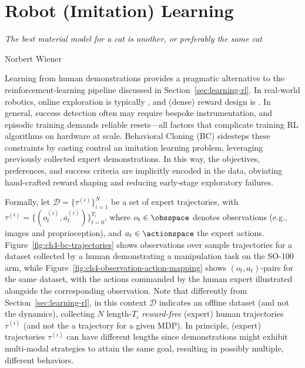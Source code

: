 \section{Robot (Imitation) Learning}
\label{sec:learning-bc-single}

\epigraph{\emph{The best material model for a cat is another, or preferably the same cat}}{Norbert Wiener}




Learning from human demonstrations provides a pragmatic alternative to the reinforcement-learning pipeline discussed in Section~\ref{sec:learning-rl}.
In real-world robotics, online exploration is typically , and (dense) reward design is .
In general, success detection often may require bespoke instrumentation, and episodic training demands reliable resets---all factors that complicate training RL algorithms on hardware at scale.
Behavioral Cloning (BC) sidesteps these constraints by casting control an imitation learning problem, leveraging previously collected expert demonstrations.
In this way, the objectives, preferences, and success criteria are implicitly encoded in the data, obviating hand-crafted reward shaping and reducing early-stage exploratory failures.

Formally, let \( \mathcal D = \{ \tau^{(i)} \}_{i=1}^N \) be a set of expert trajectories, with \( \tau^{(i)} = \{(o_t^{(i)}, a_t^{(i)})\}_{t=0}^{T_i} \), where \(o_t \in \obsspace \) denotes observations (e.g., images and proprioception), and \(a_t \in \actionspace \) the expert actions.
Figure~\ref{fig:ch4-bc-trajectories} shows observations over sample trajectories for a dataset collected by a human demonstrating a manipulation task on the SO-100 arm, while Figure~\ref{fig:ch4-observation-action-mapping} shows \( (o_t, a_t) \)-pairs for the same dataset, with the actions commanded by the human expert illustrated alongside the corresponding observation.
Note that differently from Section~\ref{sec:learning-rl}, in this context \( \mathcal D \) indicates an offline dataset (and not the dynamics), collecting \( N \) length-\( T_i \) \emph{reward-free} (expert) human trajectories \( \tau^{(i)} \) (and not the a trajectory for a given MDP).
In principle, (expert) trajectories \( \tau^{(i)} \) can have different lengths since demonstrations might exhibit multi-modal strategies to attain the same goal, resulting in possibly multiple, different behaviors.

